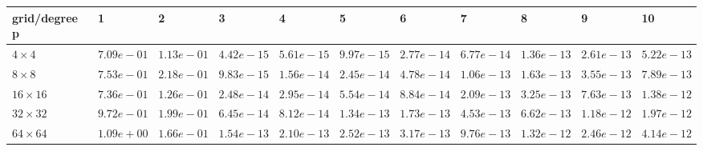 \begin{tabular}{lllllllllll}
\hline
 grid/degree p   & 1          & 2          & 3          & 4          & 5          & 6          & 7          & 8          & 9          & 10         \\
\hline
 $4 \times 4$    & $7.09e-01$ & $1.13e-01$ & $4.42e-15$ & $5.61e-15$ & $9.97e-15$ & $2.77e-14$ & $6.77e-14$ & $1.36e-13$ & $2.61e-13$ & $5.22e-13$ \\
 $8 \times 8$    & $7.53e-01$ & $2.18e-01$ & $9.83e-15$ & $1.56e-14$ & $2.45e-14$ & $4.78e-14$ & $1.06e-13$ & $1.63e-13$ & $3.55e-13$ & $7.89e-13$ \\
 $16 \times 16$  & $7.36e-01$ & $1.26e-01$ & $2.48e-14$ & $2.95e-14$ & $5.54e-14$ & $8.84e-14$ & $2.09e-13$ & $3.25e-13$ & $7.63e-13$ & $1.38e-12$ \\
 $32 \times 32$  & $9.72e-01$ & $1.99e-01$ & $6.45e-14$ & $8.12e-14$ & $1.34e-13$ & $1.73e-13$ & $4.53e-13$ & $6.62e-13$ & $1.18e-12$ & $1.97e-12$ \\
 $64 \times 64$  & $1.09e+00$ & $1.66e-01$ & $1.54e-13$ & $2.10e-13$ & $2.52e-13$ & $3.17e-13$ & $9.76e-13$ & $1.32e-12$ & $2.46e-12$ & $4.14e-12$ \\
\hline
\end{tabular}